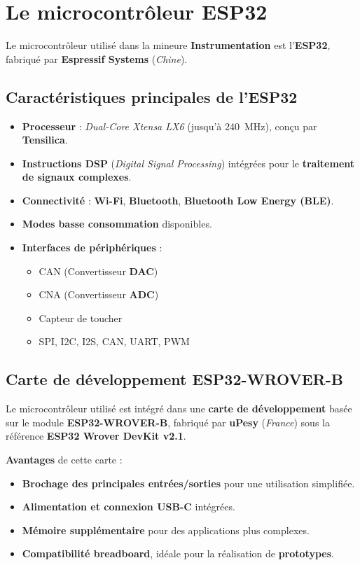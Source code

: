 \section{Le microcontrôleur ESP32}

Le microcontrôleur utilisé dans la mineure \textbf{Instrumentation} est 
l'\textbf{ESP32}, fabriqué par \textbf{Espressif Systems} (\textit{Chine}).

\subsection{Caractéristiques principales de l'ESP32}
\begin{itemize}
    \item \textbf{Processeur} : \textit{Dual-Core Xtensa LX6} (jusqu'à \SI{240}{\mega\hertz}), conçu par \textbf{Tensilica}.
    \item \textbf{Instructions DSP} (\textit{Digital Signal Processing}) intégrées pour le \textbf{traitement de signaux complexes}.
    \item \textbf{Connectivité} : \textbf{Wi-Fi}, \textbf{Bluetooth}, \textbf{Bluetooth Low Energy (BLE)}.
    \item \textbf{Modes basse consommation} disponibles.
    \item \textbf{Interfaces de périphériques} :
    \begin{itemize}
        \item CAN (Convertisseur \textbf{DAC})
        \item CNA (Convertisseur \textbf{ADC})
        \item Capteur de toucher
        \item SPI, I2C, I2S, CAN, UART, PWM
    \end{itemize}
\end{itemize}

\subsection{Carte de développement ESP32-WROVER-B}

Le microcontrôleur utilisé est intégré dans une \textbf{carte de développement} 
basée sur le module \textbf{ESP32-WROVER-B}, fabriqué par \textbf{uPesy} 
(\textit{France}) sous la référence \textbf{ESP32 Wrover DevKit v2.1}.

\textbf{Avantages} de cette carte :
\begin{itemize}
    \item \textbf{Brochage des principales entrées/sorties} pour une utilisation simplifiée.
    \item \textbf{Alimentation et connexion USB-C} intégrées.
    \item \textbf{Mémoire supplémentaire} pour des applications plus complexes.
    \item \textbf{Compatibilité breadboard}, idéale pour la réalisation de \textbf{prototypes}.
\end{itemize}

